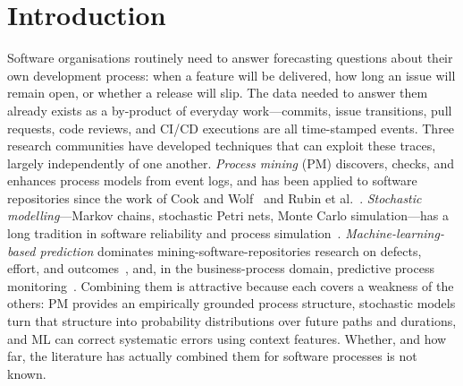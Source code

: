 \section{Introduction}
\label{sec:slr-intro}

Software organisations routinely need to answer forecasting questions about
their own development process: when a feature will be delivered, how long an
issue will remain open, or whether a release will slip. The data needed to
answer them already exists as a by-product of everyday work---commits, issue
transitions, pull requests, code reviews, and CI/CD executions are all
time-stamped events. Three research communities have developed techniques
that can exploit these traces, largely independently of one another.
\emph{Process mining} (PM) discovers, checks, and enhances process models
from event logs, and has been applied to software repositories since the
work of Cook and Wolf~\cite{cook1995,cook1998} and Rubin et
al.~\cite{rubin2007}. \emph{Stochastic modelling}---Markov chains,
stochastic Petri nets, Monte Carlo simulation---has a long tradition in
software reliability and process simulation~\cite{whittaker1994,ali2014simulation}.
\emph{Machine-learning-based prediction} dominates mining-software-repositories
research on defects, effort, and outcomes~\cite{kagdi2007msr,hall2012fault},
and, in the business-process domain, predictive process
monitoring~\cite{marquezchamorro2018predictive}. Combining them is attractive
because each covers a weakness of the others: PM provides an empirically
grounded process structure, stochastic models turn that structure into
probability distributions over future paths and durations, and ML can
correct systematic errors using context features. Whether, and how far, the
literature has actually combined them for software processes is not known.

